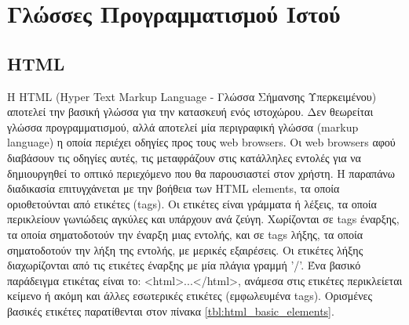 \section{Γλώσσες Προγραμματισμού Ιστού}

\subsection{HTML}
Η HTML (Hyper Text Markup Language - Γλώσσα Σήμανσης Υπερκειμένου) αποτελεί την βασική γλώσσα για την κατασκευή ενός ιστοχώρου. Δεν θεωρείται γλώσσα προγραμματισμού, αλλά αποτελεί μία περιγραφική γλώσσα (markup language) η οποία περιέχει οδηγίες προς τους web browsers. Οι web browsers αφού διαβάσουν τις οδηγίες αυτές, τις μεταφράζουν στις κατάλληλες εντολές για να δημιουργηθεί το οπτικό περιεχόμενο που θα παρουσιαστεί στον χρήστη. Η παραπάνω διαδικασία επιτυγχάνεται με την βοήθεια των HTML elements, τα οποία οριοθετούνται από ετικέτες (tags). Οι ετικέτες είναι γράμματα ή λέξεις, τα οποία περικλείουν γωνιώδεις αγκύλες και υπάρχουν ανά ζεύγη. Χωρίζονται σε tags έναρξης, τα οποία σηματοδοτούν την έναρξη μιας εντολής, και σε tags λήξης, τα οποία σηματοδοτούν την λήξη της εντολής, με μερικές εξαιρέσεις. Οι ετικέτες λήξης διαχωρίζονται από τις ετικέτες έναρξης με μία πλάγια γραμμή '/'. Ένα βασικό παράδειγμα ετικέτας είναι το: <html>...</html>, ανάμεσα στις ετικέτες περικλείεται κείμενο ή ακόμη και άλλες εσωτερικές ετικέτες (εμφωλευμένα tags). Ορισμένες βασικές ετικέτες παρατίθενται στον πίνακα \ref{tbl:html_basic_elements}.


